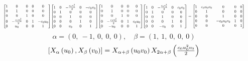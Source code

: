 \documentclass[11pt]{article}
\theoremstyle{definition}
\begin{document}
\[
\scaletoalign{\textwidth}{{\left[\begin{matrix}1 & 0 & 0 & 0 & 0\\0 & 1 & 0 & 0 & 0\\0 & 0 & 1 & 0 & 0\\0 & - \frac{c_{0} u_{0}^{2}}{2} & 0 & 1 & - c_{0} u_{0}\\0 & u_{0} & 0 & 0 & 1\end{matrix}\right]} {\left[\begin{matrix}1 & 0 & - \frac{c_{0} v_{0}^{2}}{2} & 0 & - c_{0} v_{0}\\0 & 1 & 0 & 0 & 0\\0 & 0 & 1 & 0 & 0\\0 & 0 & 0 & 1 & 0\\0 & 0 & v_{0} & 0 & 1\end{matrix}\right]} {\left[\begin{matrix}1 & 0 & 0 & 0 & 0\\0 & 1 & 0 & 0 & 0\\0 & 0 & 1 & 0 & 0\\0 & - \frac{c_{0} u_{0}^{2}}{2} & 0 & 1 & c_{0} u_{0}\\0 & - u_{0} & 0 & 0 & 1\end{matrix}\right]} {\left[\begin{matrix}1 & 0 & - \frac{c_{0} v_{0}^{2}}{2} & 0 & c_{0} v_{0}\\0 & 1 & 0 & 0 & 0\\0 & 0 & 1 & 0 & 0\\0 & 0 & 0 & 1 & 0\\0 & 0 & - v_{0} & 0 & 1\end{matrix}\right]} = {\left[\begin{matrix}1 & c_{0} u_{0} v_{0} & 0 & 0 & 0\\0 & 1 & 0 & 0 & 0\\0 & 0 & 1 & 0 & 0\\0 & 0 & - c_{0} u_{0} v_{0} & 1 & 0\\0 & 0 & 0 & 0 & 1\end{matrix}\right]}}
\]
\[
\alpha = \left( 0, \  -1, \  0, \  0, \  0\right), \quad \beta = \left( 1, \  1, \  0, \  0, \  0\right)
\]
\[
\scaletoalign{\textwidth}{\left[ X_{\alpha}\left(u_{0}\right), X_{\beta}\left(v_{0}\right) \right] = X_{\alpha + \beta}\left(u_{0} v_{0}\right) X_{2\alpha + \beta}\left(\frac{c_{0} u_{0}^{2} v_{0}}{2}\right)}
\]
\end{document}
